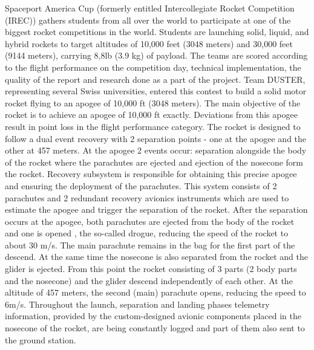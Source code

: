 \documentclass[]{iac}
\begin{document}
Spaceport America Cup (formerly entitled Intercollegiate Rocket Competition (IREC)) gathers students from all over the world to participate at one of the biggest rocket competitions in the world. Students are launching solid, liquid, and hybrid rockets to target altitudes of 10,000 feet (3048 meters) and 30,000 feet (9144 meters), carrying 8,8lb (3.9 kg) of payload. The teams are scored according to the flight performance on the competition day, technical implementation, the quality of the report and research done as a part of the project.
Team DUSTER, representing several Swiss universities, entered this contest to build a solid motor rocket flying to an apogee of 10,000 ft (3048 meters). 
The main objective of the rocket is to achieve an apogee of 10,000 ft exactly. Deviations from this apogee result in point loss in the flight performance category.  The rocket is designed to follow a dual event recovery with 2 separation points - one at the apogee and the other at 457 meters. At the apogee 2 events occur: separation alongside the body of the rocket where the parachutes are ejected and ejection of the nosecone form the rocket. 
Recovery subsystem is responsible for obtaining this precise apogee and ensuring the deployment of the parachutes. This system consists of 2 parachutes and 2 redundant recovery avionics instruments which are used to estimate the apogee and trigger the separation of the rocket. After the separation occurs at the apogee, both parachutes are ejected from the body of the rocket and one is opened , the so-called drogue, reducing the speed of the rocket to about 30 m/s. The main parachute remains in the bag for the first part of the descend. At the same time the nosecone is also separated from the rocket and the glider is ejected. From this point the rocket consisting of 3 parts (2 body parts and the nosecone) and the glider descend independently of each other. At the altitude of 457 meters, the second (main) parachute opens, reducing the speed to 6m/s. Throughout the launch, separation and landing phases telemetry information, provided by the custom-designed avionic components placed in the nosecone of the rocket, are being constantly logged and part of them also sent to the ground station. 
\end{document}
